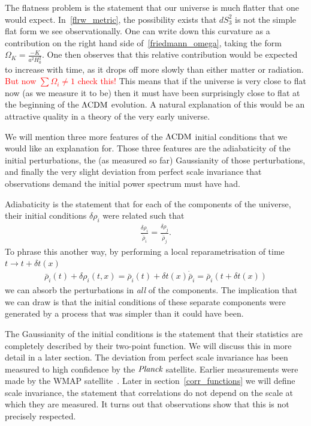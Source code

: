     The flatness problem is the statement that our universe is much flatter that one would expect.
    In~\eqref{flrw_metric}, the possibility exists that $dS_3^2$ is not the simple flat form we
    see observationally.
    One can write down this curvature as a contribution on the right hand side of~\eqref{friedmann_omega},
    taking the form $\Omega_K=\frac{-K}{a^2H_0^2}$.
    One then observes that this relative contribution would be expected to increase with time,
    as it drops off more slowly than either matter or radiation.
    \textcolor{red}{But now $\sum \Omega_i\neq1$ check this!}
    This means that if the universe is very close to flat now (as we measure it to be)
    then it must have been surprisingly close to flat at the beginning of the $\Lambda\text{CDM}$
    evolution. A natural explanation of this would be an attractive quality in a
    theory of the very early universe.


    We will mention three more features of the $\Lambda\text{CDM}$ initial conditions that we would
    like an explanation for. Those three features are the adiabaticity of the initial
    perturbations, the (as measured so far) Gaussianity of those perturbations, and finally
    the very slight deviation from perfect scale invariance that observations demand the
    initial power spectrum must have had.


    Adiabaticity is the statement that for each of the components of the universe, their
    initial conditions $\delta\rho_i$ were related such that
    \begin{align}
        \frac{\delta\rho_i}{\dot{\bar{\rho}}_i} = \frac{\delta\rho_j}{\dot{\bar{\rho}}_j}.
    \end{align}
    To phrase this another way, by performing a local reparametrisation of time $t\rightarrow t+\delta t(x)$
    \begin{align}
        \bar{\rho}_i(t)+\delta \rho_i(t,x) = \bar{\rho}_i(t)+\delta t(x)\dot{\bar{\rho}}_i
        = \bar{\rho}_i(t+\delta t(x))
    \end{align}
    we can absorb the perturbations in \textit{all} of the components. The implication that we can draw
    is that the initial conditions of these separate components were generated by a process that was simpler than
    it could have been.


    The Gaussianity of the initial conditions is the statement that their statistics are completely described by
    their two-point function. We will discuss this in more detail in a later section.
    The deviation from perfect scale invariance has been measured to high confidence by the $\textit{Planck}$
    satellite.
    Earlier measurements were made by the WMAP satellite~\cite{Senatore_wmap_2009}.
    Later in section~\ref{corr_functions} we will define scale invariance,
    the statement that correlations do not depend on the scale at which they are measured.
    It turns out that observations show that this is not precisely respected.


